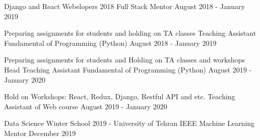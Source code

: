 \begin{cventries}


\cventry
{Django and React}
{Webelopers 2018 Full Stack Mentor}
{August 2018 - January 2019}
{}
{}

\cventry
{Preparing assignments for students and holding on TA classes}
{Teaching Assistant Fundamental of Programming (Python) }
{August 2018 - January 2019}
{}
{}

\cventry
{Preparing assignments for students and Holding on TA classes and workshops}
{Head Teaching Assistant Fundamental of Programming (Python)}
{August 2019 - January 2020}
{}
{}

\cventry
{Hold on Workshops: React, Redux, Django, Restful API and etc.}
{Teaching Assistant of Web course}
{August 2019 - January 2020}
{}
{}

\cventry
{Data Science Winter School 2019 - University of Tehran}
{IEEE Machine Learning Mentor}
{December 2019}
{}
{}	
	

	
	

\end{cventries}

